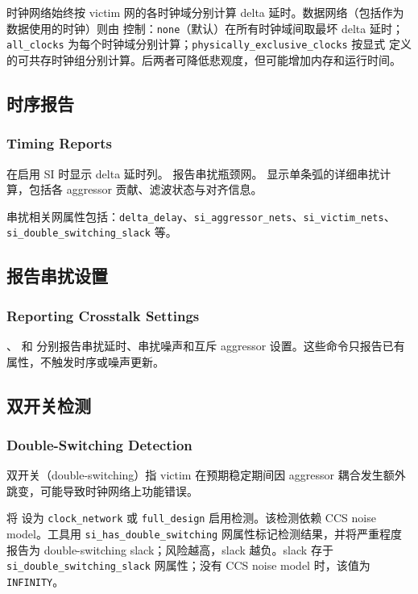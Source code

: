 时钟网络始终按 victim 网的各时钟域分别计算 delta 延时。数据网络（包括作为数据使用的时钟）则由  控制：\texttt{none}（默认）在所有时钟域间取最坏 delta 延时；\texttt{all\_clocks} 为每个时钟域分别计算；\texttt{physically\_exclusive\_clocks} 按显式  定义的可共存时钟组分别计算。后两者可降低悲观度，但可能增加内存和运行时间。

\subsection{时序报告}
\subsubsection*{Timing Reports}

 在启用 SI 时显示 delta 延时列。 报告串扰瓶颈网。 显示单条弧的详细串扰计算，包括各 aggressor 贡献、滤波状态与对齐信息。

串扰相关网属性包括：\texttt{delta\_delay}、\texttt{si\_aggressor\_nets}、\texttt{si\_victim\_nets}、\texttt{si\_double\_switching\_slack} 等。

\subsection{报告串扰设置}
\subsubsection*{Reporting Crosstalk Settings}

、 和  分别报告串扰延时、串扰噪声和互斥 aggressor 设置。这些命令只报告已有属性，不触发时序或噪声更新。

\subsection{双开关检测}
\subsubsection*{Double-Switching Detection}

双开关（double-switching）指 victim 在预期稳定期间因 aggressor 耦合发生额外跳变，可能导致时钟网络上功能错误。

将  设为 \texttt{clock\_network} 或 \texttt{full\_design} 启用检测。该检测依赖 CCS noise model。工具用 \texttt{si\_has\_double\_switching} 网属性标记检测结果，并将严重程度报告为 double-switching slack；风险越高，slack 越负。slack 存于 \texttt{si\_double\_switching\_slack} 网属性；没有 CCS noise model 时，该值为 \texttt{INFINITY}。

